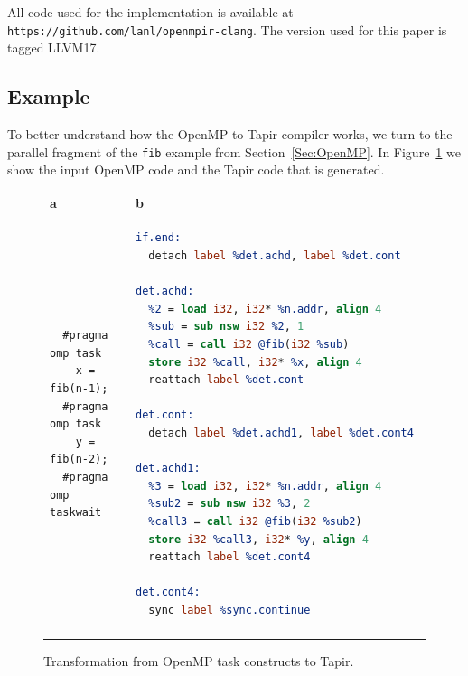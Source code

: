 \documentclass[sigconf]{acmart}
\newcommand{\subfiglabel}[1]    {\textbf{#1}}
\begin{document}
All code used for the implementation is available at \\
\texttt{https://github.com/lanl/openmpir-clang}. The version used for this
paper is tagged LLVM17.

\subsection{Example} \label{Sec:Example}

To better understand how the OpenMP to Tapir compiler works, we turn to the
parallel fragment of the \texttt{fib} example from Section~\ref{Sec:OpenMP}. In
Figure~\ref{fig:tapir-example} we show the input OpenMP code and the Tapir code
that is generated.

\begin{figure}[h!]
\begin{tabular*}{\linewidth}{@{\extracolsep{\fill}}ll}
\subfiglabel{a} & \subfiglabel{b} \\
\begin{minipage}[T]{0.45\linewidth}
\begin{lstlisting}
  #pragma omp task
    x = fib(n-1);  
  #pragma omp task
    y = fib(n-2);  
  #pragma omp taskwait
\end{lstlisting}
\end{minipage}
&
\begin{minipage}[T]{0.45\linewidth}
\begin{lstlisting}[language=llvm]
if.end:                                 
  detach label %det.achd, label %det.cont

det.achd:                                 
  %2 = load i32, i32* %n.addr, align 4
  %sub = sub nsw i32 %2, 1
  %call = call i32 @fib(i32 %sub)
  store i32 %call, i32* %x, align 4
  reattach label %det.cont

det.cont:                                   
  detach label %det.achd1, label %det.cont4

det.achd1:                                
  %3 = load i32, i32* %n.addr, align 4
  %sub2 = sub nsw i32 %3, 2
  %call3 = call i32 @fib(i32 %sub2)
  store i32 %call3, i32* %y, align 4
  reattach label %det.cont4

det.cont4:                                  
  sync label %sync.continue
\end{lstlisting}
\end{minipage}\\
\addlinespace[2ex]
\bottomrule
\end{tabular*}
\caption{Transformation from OpenMP task constructs to Tapir.}
\label{fig:tapir-example}
\end{figure}
\end{document}
